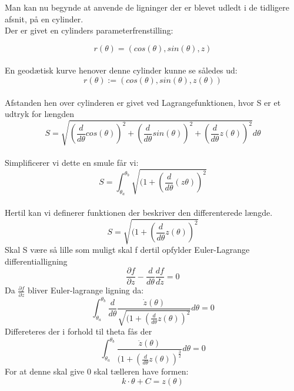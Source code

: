 
Man kan nu begynde at anvende de ligninger der er blevet udledt i de tidligere afsnit, på en cylinder.
\\
Der er givet en cylinders parameterfrenstilling:

\begin{equation}
r(\theta)=(cos(\theta),sin(\theta),z)
\end{equation}
\\
En geodætisk kurve henover denne cylinder kunne se således ud:
\\
\begin{equation}
r(\theta):=(cos(\theta),sin(\theta),z(\theta))
\end{equation}
\\
Afstanden hen over cylinderen er givet ved Lagrangefunktionen, hvor S er et udtryk for længden
\begin{equation}
S = \sqrt{(\frac{d}{d\theta}cos(\theta))^2+(\frac{d}{d\theta}sin(\theta))^2+(\frac{d}{d\theta}z(\theta))^2}d\theta
\end{equation}
\\
Simplificerer vi dette en smule får vi:
\begin{equation*}
S=\int_{\theta_a}^{\theta_b}\sqrt{(1+(\frac{d}{d\theta}(z\theta))^2}
\end{equation*}
\\
Hertil kan vi definerer funktionen der beskriver den differenterede længde.
\begin{equation*}
S=\sqrt{(1+(\frac{d}{d\theta}z(\theta))^2}
\end{equation*}
Skal S være så lille som muligt skal f dertil opfylder Euler-Lagrange differentialligning
\begin{equation}
\frac{\partial f}{\partial z}-\frac{d}{d \theta} \frac{d f}{d\dot{z}}=0
\end{equation}
Da $\frac{\partial f}{\partial z}$ bliver Euler-lagrange ligning da:
\begin{equation}
\int_{\theta_a}^{\theta_b}\frac{d}{d\theta}\frac{\dot{z}(\theta)}{\sqrt{(1+(\frac{d}{d\theta}z(\theta))^2}}d\theta = 0
\end{equation}
Differeteres der i forhold til theta fås der
\begin{equation}
\int_{\theta_a}^{\theta_b}\frac{\ddot{z} (\theta)}{(1+(\frac{d}{d\theta}z(\theta))^\frac{3}{2}}d\theta = 0
\end{equation}
For at denne skal give 0 skal tælleren have formen:
\begin{equation}
k\cdot \theta+C = z(\theta)
\end{equation}
